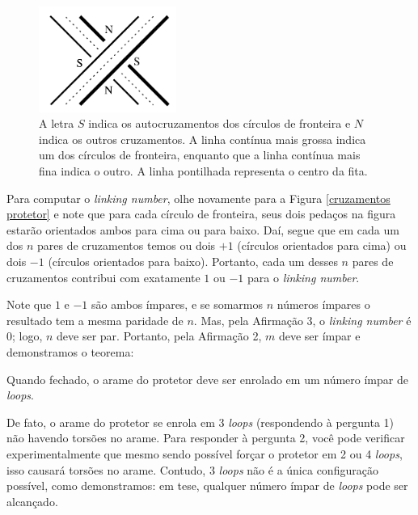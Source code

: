 	\begin{figure}[H]
		\begin{center}
			\includegraphics[width=4.5cm]{Images/protetor_fechado.png}
		\end{center}\caption{A letra $S$ indica os autocruzamentos dos círculos de fronteira e $N$ indica os outros cruzamentos. A linha contínua mais grossa indica um dos círculos de fronteira, enquanto que a linha contínua mais fina indica o outro. A linha pontilhada representa o centro da fita.}\label{cruzamentos protetor}
	\end{figure}
	\par\vspace{0.3cm} Para computar o \textit{linking number}, olhe novamente para a Figura \eqref{cruzamentos protetor} e note que para cada círculo de fronteira, seus dois pedaços na figura estarão orientados ambos para cima ou para baixo. Daí, segue que em cada um dos $n$ pares de cruzamentos temos ou dois $+1$ (círculos orientados para cima) ou dois $-1$ (círculos orientados para baixo). Portanto, cada um desses $n$ pares de cruzamentos contribui com exatamente $1$ ou $-1$ para o \textit{linking number}.
	\par\vspace{0.3cm} Note que $1$ e $-1$ são ambos ímpares, e se somarmos $n$ números ímpares o resultado tem a mesma paridade de $n$. Mas, pela Afirmação 3, o \textit{linking number} é $0$; logo, $n$ deve ser par. Portanto, pela Afirmação 2, $m$ deve ser ímpar e demonstramos o teorema:
	\begin{theorem}
		\label{teorema protetor de para-brisa}
		Quando fechado, o arame do protetor deve ser enrolado em um número ímpar de \textit{loops}.
	\end{theorem}  
	\par\vspace{0.3cm} De fato, o arame do protetor se enrola em 3 \textit{loops} (respondendo à pergunta 1) não havendo torsões no arame. Para responder à pergunta 2, você pode verificar experimentalmente que mesmo sendo possível forçar o protetor em 2 ou 4 \textit{loops}, isso causará torsões no arame. Contudo, $3$ \textit{loops} não é a única configuração possível, como demonstramos: em tese, qualquer número ímpar de \textit{loops} pode ser alcançado.
